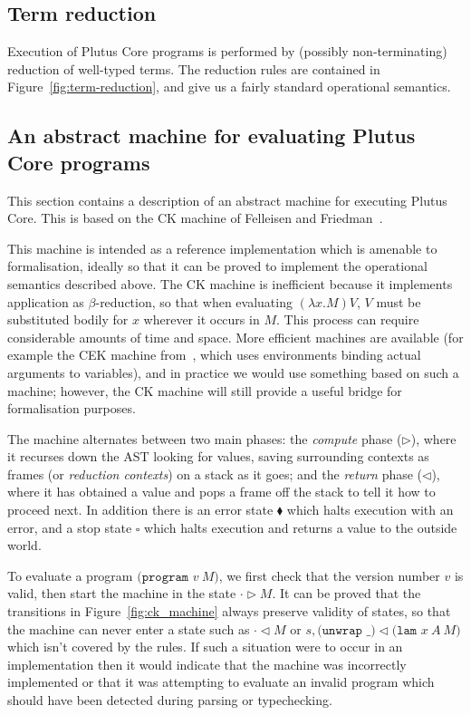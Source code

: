 \documentclass[a4paper]{article}
\begin{document}



\newpage
\subsection{Term reduction}
Execution of Plutus Core programs is performed by (possibly
non-terminating) reduction of well-typed terms.  The reduction rules
are contained in Figure~\ref{fig:term-reduction}, and give us a fairly
standard operational semantics.  



\subsection{An abstract machine for evaluating Plutus Core programs}
This section contains a description of an abstract machine for
executing Plutus Core.  This is based on the CK machine of Felleisen
and Friedman~\citep{Felleisen-CK-CEK}. 

This machine is intended as a reference implementation which is
amenable to formalisation, ideally so that it can be proved to
implement the operational semantics described above.  The CK machine
is inefficient because it implements application as $\beta$-reduction,
so that when evaluating $(\lambda x.M)V$, $V$ must be substituted
bodily for $x$ wherever it occurs in $M$.  This process can require
considerable amounts of time and space.  More efficient machines are
available (for example the CEK machine from~\citep{Felleisen-CK-CEK},
which uses environments binding actual arguments to variables), and in
practice we would use something based on such a machine; however, the
CK machine will still provide a useful bridge for formalisation
purposes.



\noindent The machine alternates between two main phases: the
\textit{compute} phase ($\triangleright$), where it recurses down
the AST looking for values, saving surrounding contexts as frames (or
\textit{reduction contexts}) on a stack as it goes; and the 
\textit{return} phase ($\triangleleft$), where it has obtained a value and
pops a frame off the stack to tell it how to proceed next.  In
addition there is an error state $\blacklozenge$ which halts execution
with an error, and a stop state $\square$ which halts execution and
returns a value to the outside world.

To evaluate a program $\texttt{(program } v\ M \texttt{)}$, we first
check that the version number $v$ is valid, then start the machine in
the state $\cdot \triangleright M$.  It can be proved that the
transitions in Figure~\ref{fig:ck_machine} always preserve
validity of states, so that the machine can never enter a state such as
  $\cdot \triangleleft M$
or
$s, \texttt{(unwrap \_)} \triangleleft \texttt{(lam }x\ A \ M\texttt{)}$
which isn't covered by the rules.  If such a
situation were to occur in an implementation then it would indicate
that the machine was incorrectly implemented or that it was attempting
to evaluate an invalid program which should have been detected during
parsing or typechecking.
\end{document}
